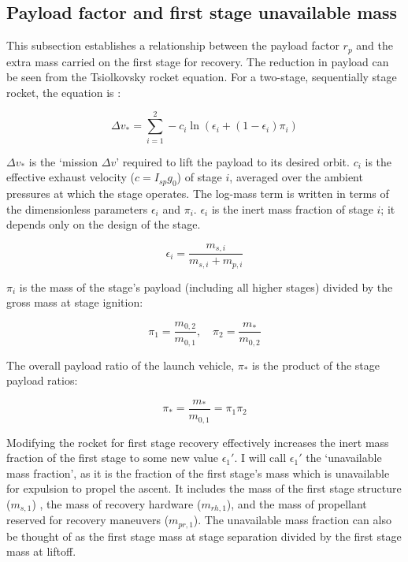 \documentclass[conf]{new-aiaa}
\begin{document}
\subsection{Payload factor and first stage unavailable mass}
This subsection establishes a relationship between the payload factor $r_p$ and the extra mass carried on the first stage for recovery.
The reduction in payload can be seen from the Tsiolkovsky rocket equation. For a two-stage, sequentially stage rocket, the equation is \cite{Wiesel2010}:

\begin{equation}
\Delta v_* =  \sum_{i=1}^{2} - c_i \ln\left( \epsilon_i + (1 - \epsilon_i) \pi_i \right)
\end{equation} 

$\Delta v_*$ is the `mission $\Delta v$' required to lift the payload to its desired orbit. $c_i$ is the effective exhaust velocity ($c = I_{sp} g_0$) of stage $i$, averaged over the ambient pressures at which the stage operates. The log-mass term is written in terms of the dimensionless parameters $\epsilon_i$ and $\pi_i$. $\epsilon_i$ is the inert mass fraction of stage $i$; it depends only on the design of the stage.

\begin{equation}
\epsilon_i = \frac{m_{s,i}}{m_{s,i} + m_{p,i}}
\end{equation}

$\pi_i$ is the mass of the stage's payload (including all higher stages) divided by the gross mass at stage ignition:

\begin{equation}
\pi_1 = \frac{m_{0,2}}{m_{0,1}}, \quad \pi_2 = \frac{m_*}{m_{0,2}}
\end{equation}

The overall payload ratio of the launch vehicle, $\pi_*$ is the product of the stage payload ratios:

\begin{equation}
\label{eq:pi_star}
\pi_* = \frac{m_*}{m_{0,1}} = \pi_1 \pi_2
\end{equation} 

Modifying the rocket for first stage recovery effectively increases the inert mass fraction of the first stage to some new value $\epsilon_1'$. I will call $\epsilon_1'$ the `unavailable mass fraction', as it is the fraction of the first stage's mass which is unavailable for expulsion to propel the ascent. It includes the mass of the first stage structure ($m_{s,1}$) , the mass of recovery hardware ($m_{rh,1}$), and the mass of propellant reserved for recovery maneuvers ($m_{pr,1}$). The unavailable mass fraction can also be thought of as the first stage mass at stage separation divided by the first stage mass at liftoff.
\end{document}
